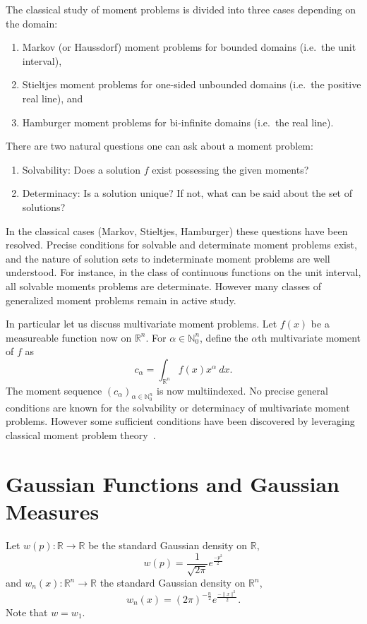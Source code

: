 \documentclass{amsart}
\theoremstyle{remark}
\numberwithin{equation}{section}
\newcommand{\RR}{\mathbb{R}}
\newcommand{\NN}{\mathbb{N}}
\begin{document}
The classical study of moment problems is divided into three cases depending on the domain: 
\begin{enumerate}
\item Markov (or Haussdorf) moment problems for bounded domains (i.e.\ the unit interval), 
\item Stieltjes moment problems for one-sided unbounded domains (i.e.\ the positive real line), and 
\item Hamburger moment problems for bi-infinite domains (i.e.\ the real line).
\end{enumerate}

There are two natural questions one can ask about a moment problem:
\begin{enumerate}
\item Solvability: Does a solution $f$ exist possessing the given moments?
\item Determinacy: Is a solution unique? If not, what can be said about the set of solutions?
\end{enumerate}
In the classical cases (Markov, Stieltjes, Hamburger) these questions have been resolved. Precise conditions for solvable and determinate moment problems exist, and the nature of solution sets to indeterminate moment problems are well understood. For instance, in the class of continuous functions on the unit interval, all solvable moments problems are determinate. However many classes of generalized moment problems remain in active study.

In particular let us discuss multivariate moment problems. Let $f(x)$ be a measureable function now on $\RR^n$. For $\alpha \in \NN_0^n$, define the $\alpha$th multivariate moment of $f$ as 
\[
    c_\alpha = \int_{\RR^n} f(x)x^\alpha ~ dx.
\]
The moment sequence ${(c_\alpha)}_{\alpha \in \NN_0^n}$ is now multiindexed. No precise general conditions are known for the solvability or determinacy of multivariate moment problems. However some sufficient conditions have been discovered by leveraging classical moment problem theory~\cite{Pete82}.


\newpage
\section{Gaussian Functions and Gaussian Measures}
Let $w(p) : \RR \rightarrow \RR$  be the standard Gaussian density on $\RR$,
\[
    w(p) = \frac1{\sqrt{2\pi}}e^{\frac{-p^2}2}
\]
and $w_n(x) : \RR^n \rightarrow \RR$ the standard Gaussian density on $\RR^n$,
\[
    w_n(x) = {(2\pi)}^{-\frac n2} e^{\frac{-\|x\|^2}2}.
\]
Note that $w = w_1$.
\end{document}
